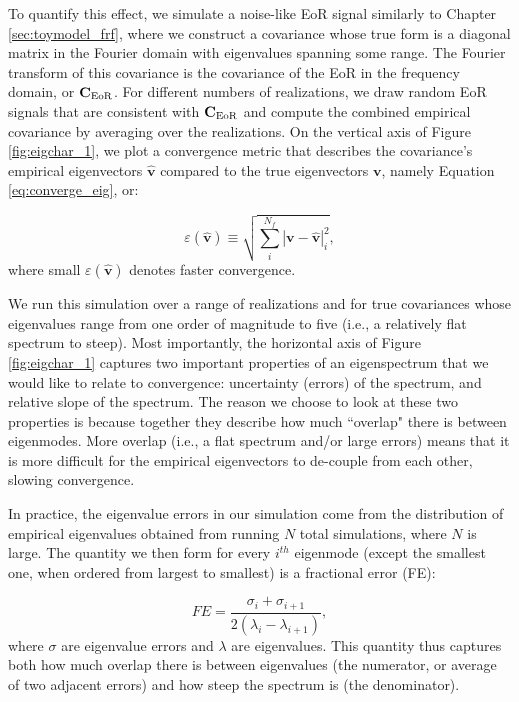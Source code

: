 To quantify this effect, we simulate a noise-like EoR signal similarly to Chapter \ref{sec:toymodel_frf}, where we construct a covariance whose true form is a diagonal matrix in the Fourier domain with eigenvalues spanning some range. The Fourier transform of this covariance is the covariance of the EoR in the frequency domain, or $\textbf{C}_{\rm EoR}$. For different numbers of realizations, we draw random EoR signals that are consistent with $\textbf{C}_{\rm EoR}$ and compute the combined empirical covariance by averaging over the realizations. On the vertical axis of Figure \ref{fig:eigchar_1}, we plot a convergence metric that describes the covariance's empirical eigenvectors $\widehat{\textbf{v}}$ compared to the true eigenvectors $\textbf{v}$, namely Equation \eqref{eq:converge_eig}, or:

\begin{equation}
\label{eq:converge_eig2}
\varepsilon (\widehat{\textbf{v}}) \equiv \sqrt{\sum_{i}^{N_{f}}|\textbf{v}-\widehat{\textbf{v}}|_{i}^2},
\end{equation}
where small $\varepsilon (\widehat{\textbf{v}})$ denotes faster convergence.

We run this simulation over a range of realizations and for true covariances whose eigenvalues range from one order of magnitude to five (i.e., a relatively flat spectrum to steep). Most importantly, the horizontal axis of Figure \ref{fig:eigchar_1} captures two important properties of an eigenspectrum that we would like to relate to convergence: uncertainty (errors) of the spectrum, and relative slope of the spectrum. The reason we choose to look at these two properties is because together they describe how much ``overlap" there is between eigenmodes. More overlap (i.e., a flat spectrum and/or large errors) means that it is more difficult for the empirical eigenvectors to de-couple from each other, slowing convergence. 

In practice, the eigenvalue errors in our simulation come from the distribution of empirical eigenvalues obtained from running $N$ total simulations, where $N$ is large. The quantity we then form for every $i^{th}$ eigenmode (except the smallest one, when ordered from largest to smallest) is a fractional error (FE):

\begin{equation}
FE = \frac{\sigma_{i} + \sigma_{i+1}}{2(\lambda_{i} - \lambda_{i+1})},
\end{equation}
where $\sigma$ are eigenvalue errors and $\lambda$ are eigenvalues. This quantity thus captures both how much overlap there is between eigenvalues (the numerator, or average of two adjacent errors) and how steep the spectrum is (the denominator). 

